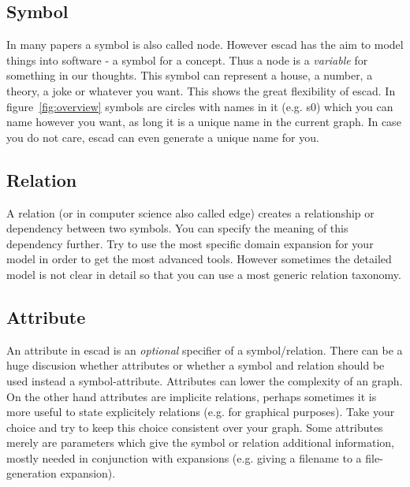 \documentclass[a4paper, 12pt, openany]{scrbook}
\begin{document}
\subsection{Symbol}
In many papers a symbol is also called node. However escad has the aim to model things into software - a symbol for a concept. Thus a node is a \emph{variable} for something in our thoughts. This symbol can represent a house, a number, a theory, a joke or whatever you want. This shows the great flexibility of escad. In figure~\ref{fig:overview} symbols are circles with names in it (e.g. s0) which you can name however you want, as long it is a unique name in the current graph. In case you do not care, escad can even generate a unique name for you.
\subsection{Relation}
A relation (or in computer science also called edge) creates a relationship or dependency between two symbols. You can specify the meaning of this dependency further. Try to use the most specific domain expansion for your model in order to get the most advanced tools. However sometimes the detailed model is not clear in detail so that you can use a most generic relation taxonomy.
\subsection{Attribute}
An attribute in escad is an \emph{optional} specifier of a symbol/relation. There can be a huge discusion whether attributes or whether a symbol and relation should be used instead a symbol-attribute. Attributes can lower the complexity of an graph. On the other hand attributes are implicite relations, perhaps sometimes it is more useful to state explicitely relations (e.g. for graphical purposes). Take your choice and try to keep this choice consistent over your graph. Some attributes merely are parameters which give the symbol or relation additional information, mostly needed in conjunction with expansions (e.g. giving a filename to a file-generation expansion).
\end{document}
